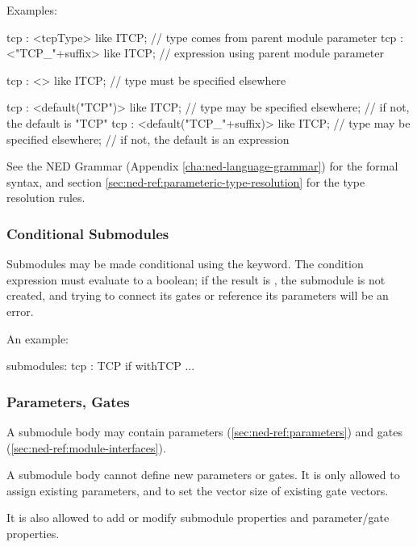 Examples:

\begin{ned}
tcp : <tcpType> like ITCP;        // type comes from parent module parameter
tcp : <"TCP_"+suffix> like ITCP;  // expression using parent module parameter

tcp : <> like ITCP;               // type must be specified elsewhere

tcp : <default("TCP")> like ITCP; // type may be specified elsewhere;
                                  // if not, the default is "TCP"
tcp : <default("TCP_"+suffix)> like ITCP;
                                  // type may be specified elsewhere;
                                  // if not, the default is an expression
\end{ned}

See the NED Grammar (Appendix \ref{cha:ned-language-grammar}) for the
formal syntax, and section \ref{sec:ned-ref:parameteric-type-resolution}
for the type resolution rules.


\subsubsection{Conditional Submodules}
\label{sec:ned-ref:conditional-submodules}

Submodules may be made conditional using the  keyword. The
condition expression must evaluate to a boolean; if the result is
, the submodule is not created, and trying to connect its gates
or reference its parameters will be an error.

An example:

\begin{ned}
submodules:
  tcp : TCP if withTCP { ... }
\end{ned}


\subsubsection{Parameters, Gates}
\label{sec:ned-ref:parameters-gates}

A submodule body may contain parameters (\ref{sec:ned-ref:parameters})
and gates (\ref{sec:ned-ref:module-interfaces}).

A submodule body cannot define new parameters or gates. It is only
allowed to assign existing parameters, and to set the vector
size of existing gate vectors.

It is also allowed to add or modify submodule properties and
parameter/gate properties.



